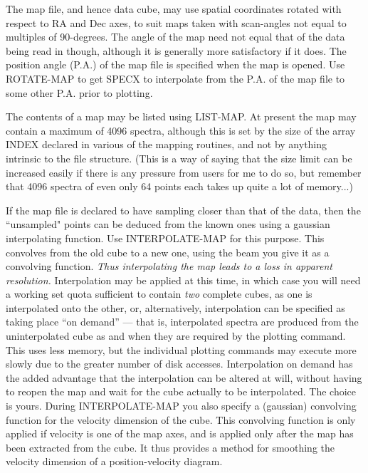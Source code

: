 \documentclass[11pt,twoside]{report}
\begin{document}
The map file, and hence data cube, may use spatial coordinates rotated with
respect to RA and Dec axes,  to suit maps taken
with scan-angles not equal to multiples of 90-degrees. The angle of the map
need not equal that of the data being read in though, although it is generally
more satisfactory if it does. The position angle (P.A.)  of the map file is specified when the map is opened. Use ROTATE-MAP to
get SPECX to interpolate from the P.A. of the map file to some other P.A. prior
to plotting.

The contents of a map may be listed using LIST-MAP. At present the map may
contain a maximum of 4096 spectra,  although
this is set by the size of the array INDEX declared in various of the mapping
routines, and not by anything intrinsic to the file structure. (This is a way
of saying that the size limit can be increased easily if there is any pressure
from users for me to do so, but remember that 4096 spectra of even only 64
points each takes up quite a lot of memory...)

If the map file is declared to have sampling closer than that of the data, then
the ``unsampled" points can be deduced from the known ones using a gaussian
interpolating function.  Use INTERPOLATE-MAP for this
purpose. This convolves from the old cube to a new one, using the beam you give
it as a convolving function. {\em Thus interpolating the map leads to a loss in
apparent resolution.} Interpolation may be applied at this time, in which case
you will need a working set quota sufficient to contain {\em two} complete
cubes, as one is interpolated onto the other, or, alternatively, interpolation
can be specified as taking place ``on demand'' --- that is, interpolated spectra
are produced from the uninterpolated cube as and when they are required by the
plotting command. This uses less memory, but the individual plotting commands
may execute more slowly due to the greater number of disk accesses.
Interpolation on demand has the added advantage that the interpolation can be
altered at will, without having to reopen the map and wait for the cube
actually to be interpolated. The choice is yours. During INTERPOLATE-MAP you
also specify a (gaussian) convolving function for the velocity dimension of the
cube. This convolving function is only applied if velocity is one of the map
axes, and is applied only after the map has been extracted from the cube. It
thus provides a method for smoothing the velocity dimension of a
position-velocity diagram.
\end{document}
